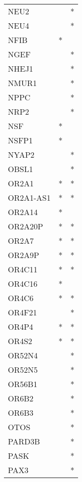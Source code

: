 \begin{longtable}{lcc}
NEU2           &           &       * \\
NEU4           &           &       * \\
NFIB           &         * &         \\
NGEF           &           &       * \\
NHEJ1          &           &       * \\
NMUR1          &           &       * \\
NPPC           &           &       * \\
NRP2           &           &       * \\
NSF            &         * &         \\
NSFP1          &         * &         \\
NYAP2          &           &       * \\
OBSL1          &           &       * \\
OR2A1          &         * &       * \\
OR2A1-AS1      &         * &       * \\
OR2A14         &         * &         \\
OR2A20P        &         * &       * \\
OR2A7          &         * &       * \\
OR2A9P         &         * &       * \\
OR4C11         &         * &       * \\
OR4C16         &         * &         \\
OR4C6          &         * &       * \\
OR4F21         &           &       * \\
OR4P4          &         * &       * \\
OR4S2          &         * &       * \\
OR52N4         &           &       * \\
OR52N5         &           &       * \\
OR56B1         &           &       * \\
OR6B2          &           &       * \\
OR6B3          &           &       * \\
OTOS           &           &       * \\
PARD3B         &           &       * \\
PASK           &           &       * \\
PAX3           &           &       * \\

\end{longtable}
